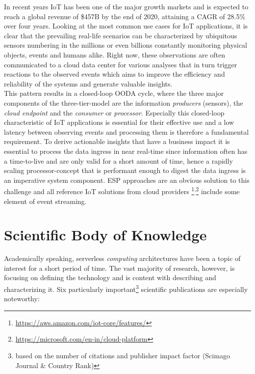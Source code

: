 In recent years \acf{IoT} has been one of the major growth markets and is expected to reach a global revenue of \$457B by the end of 2020, attaining a \acf{CAGR} of 28.5\% over four years.\autocite{Columbus20172017Forecasts} Looking at the most common use cases for IoT applications, it is clear that the prevailing real-life scenarios can be characterized by ubiquitous sensors numbering in the millions or even billions constantly monitoring physical objects, events and humans alike. Right now, these observations are often communicated to a cloud data center for various analyses that in turn trigger reactions to the observed events which aims to improve the efficiency and reliability of the systems and generate valuable insights.\autocite{Yannuzzi2014KeyComputing} \\
This pattern results in a closed-loop \acf{OODA} cycle, where the three major components of the three-tier-model are the information \textit{producers} (sensors), the \textit{cloud endpoint} and the \textit{consumer} or \textit{processor}.\autocite{Shukla2017BenchmarkingApplications} Especially this closed-loop characteristic of IoT applications is essential for their effective use and a low latency between observing events and processing them is therefore a fundamental requirement. To derive actionable insights that have a business impact it is essential to process the data ingress in near real-time since information often has a time-to-live and are only valid for a short amount of time, hence a rapidly scaling processor-concept that is performant enough to digest the data ingress is an imperative system component. \acf{ESP} approaches are an obvious solution to this challenge and all reference IoT solutions from cloud providers \footnote{\url{https://aws.amazon.com/iot-core/features/}}\textsuperscript{,}\footnote{\url{https://microsoft.com/en-in/cloud-platform}} include some element of event streaming.

\section{Scientific Body of Knowledge}

Academically speaking, serverless \textit{computing} architectures have been a topic of interest for a short period of time. The vast majority of research, however, is focusing on defining the technology and is content with describing and characterizing it. Six particularly important\footnote{based on the number of citations and publisher impact factor (Scimago Journal \& Country Rank)} scientific publications are especially noteworthy:


